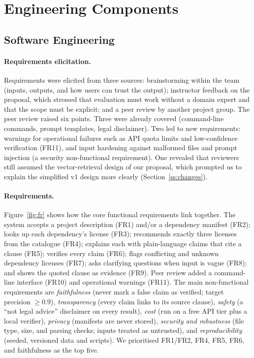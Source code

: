 \section{Engineering Components}
\label{s:eng}

\subsection{Software Engineering}
\label{ss:se}

\paragraph{Requirements elicitation.}
Requirements were elicited from three sources: brainstorming within the team (inputs, outputs, and how users can trust the output); instructor feedback on the proposal, which stressed that evaluation must work without a domain expert and that the scope must be explicit; and a peer review by another project group. The peer review raised six points. Three were already covered (command-line commands, prompt templates, legal disclaimer). Two led to new requirements: warnings for operational failures such as API quota limits and low-confidence verification (FR11), and input hardening against malformed files and prompt injection (a security non-functional requirement). One revealed that reviewers still assumed the vector-retrieval design of our proposal, which prompted us to explain the simplified v1 design more clearly (Section~\ref{ss:changes}).

\paragraph{Requirements.}
Figure~\ref{fig:fr} shows how the core functional requirements link together. The system accepts a project description (FR1) and/or a dependency manifest (FR2); looks up each dependency's license (FR3); recommends exactly three licenses from the catalogue (FR4); explains each with plain-language claims that cite a clause (FR5); verifies every claim (FR6); flags conflicting and unknown dependency licenses (FR7); asks clarifying questions when input is vague (FR8); and shows the quoted clause as evidence (FR9). Peer review added a command-line interface (FR10) and operational warnings (FR11). The main non-functional requirements are \emph{faithfulness} (never mark a false claim as verified; target precision $\geq 0.9$), \emph{transparency} (every claim links to its source clause), \emph{safety} (a ``not legal advice'' disclaimer on every result), \emph{cost} (run on a free API tier plus a local verifier), \emph{privacy} (manifests are never stored), \emph{security and robustness} (file type, size, and parsing checks; inputs treated as untrusted), and \emph{reproducibility} (seeded, versioned data and scripts). We prioritised FR1/FR2, FR4, FR5, FR6, and faithfulness as the top five.

